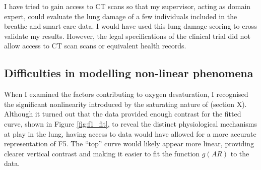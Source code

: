 I have tried to gain access to CT scans so that my supervisor, acting as domain expert, could evaluate the lung damage of a few individuals included in the breathe and smart care data. I would have used this lung damage scoring to cross validate my results. However, the legal specifications of the clinical trial did not allow access to CT scan scans or equivalent health records.

\subsection{Difficulties in modelling non-linear phenomena}
When I examined the factors contributing to oxygen desaturation, I recognised the significant nonlinearity introduced by the saturating nature of \SP (section X). Although it turned out that the data provided enough contrast for the fitted curve, shown in Figure \ref{fig:f1_fit}, to reveal the distinct physiological mechanisms at play in the lung, having access to \PA data would have allowed for a more accurate representation of F5. The “top” curve would likely appear more linear, providing clearer vertical contrast and making it easier to fit the function $g(AR)$ to the data.








